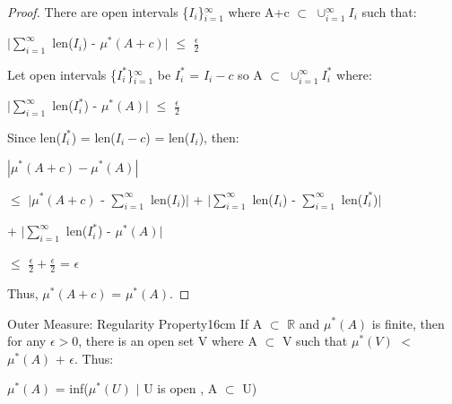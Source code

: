    \begin{proof}
        There are open intervals \{$I_i$\}$_{i=1}^{\infty}$
        where A+c $\subset$ $\cup_{i=1}^{\infty} I_i$ such that:

        \hspace{0.5cm}
        $|\sum_{i=1}^{\infty}$ len($I_i$) - $\mu^*(A+c)|$
        $\leq$ $\frac{\epsilon}{2}$

        Let open intervals \{$I_i^*$\}$_{i=1}^{\infty}$
        be $I_i^*$ = $I_i-c$ so A $\subset$ $\cup_{i=1}^{\infty} I_i^*$ where:

        \hspace{0.5cm}
        $|\sum_{i=1}^{\infty}$ len($I_i^*$) - $\mu^*(A)|$
        $\leq$ $\frac{\epsilon}{2}$

        Since len($I_i^*$) = len($I_i-c$) = len($I_i$), then:

        \hspace{0.5cm}
        $|\mu^*(A+c) - \mu^*(A)|$

        \hspace{0.5cm}
        $\leq$ $|\mu^*(A+c)$ - $\sum_{i=1}^{\infty}$ len($I_i$)$|$
                + $|\sum_{i=1}^{\infty}$ len($I_i$)
                    - $\sum_{i=1}^{\infty}$ len($I_i^*$)$|$
                
                \hspace{1cm}
                + $|\sum_{i=1}^{\infty}$ len($I_i^*$) - $\mu^*(A)|$

        \hspace{0.5cm}
        $\leq$ $\frac{\epsilon}{2} + \frac{\epsilon}{2}$
        = $\epsilon$

        Thus, $\mu^*(A+c)$ = $\mu^*(A)$.
    \end{proof}

    \vspace{0.5cm}



    \begin{wtheorem}{Outer Measure: Regularity Property}{16cm}
        If A $\subset$ $\mathbb{R}$ and $\mu^*(A)$ is finite,
        then for any $\epsilon > 0$, there is an open set V
        where A $\subset$ V such that
        $\mu^*(V)$ $<$ $\mu^*(A)$ + $\epsilon$. Thus:

        \hspace{0.5cm}
        $\mu^*(A)$ = inf($\mu^*(U)$ $|$ U is open , A $\subset$ U)
    \end{wtheorem}

